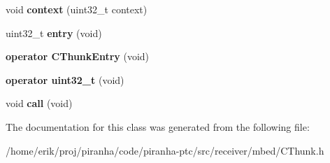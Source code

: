 \begin{DoxyCompactItemize}
\item 
void {\bfseries context} (uint32\+\_\+t context)\hypertarget{classCThunk_a71aee6a8caa8563244ef20708b481ca7}{}\label{classCThunk_a71aee6a8caa8563244ef20708b481ca7}

\item 
uint32\+\_\+t {\bfseries entry} (void)\hypertarget{classCThunk_ab34d8d415f55a285a226b20ff59b4f46}{}\label{classCThunk_ab34d8d415f55a285a226b20ff59b4f46}

\item 
{\bfseries operator C\+Thunk\+Entry} (void)\hypertarget{classCThunk_a7a3df7f10759ed8af0da093e9b2e1723}{}\label{classCThunk_a7a3df7f10759ed8af0da093e9b2e1723}

\item 
{\bfseries operator uint32\+\_\+t} (void)\hypertarget{classCThunk_acdcf94676900cb00a5ff753b6be957b6}{}\label{classCThunk_acdcf94676900cb00a5ff753b6be957b6}

\item 
void {\bfseries call} (void)\hypertarget{classCThunk_aaae3f0fa103eb1f515368f884252f1ad}{}\label{classCThunk_aaae3f0fa103eb1f515368f884252f1ad}

\end{DoxyCompactItemize}


The documentation for this class was generated from the following file\+:\begin{DoxyCompactItemize}
\item 
/home/erik/proj/piranha/code/piranha-\/ptc/src/receiver/mbed/C\+Thunk.\+h\end{DoxyCompactItemize}
